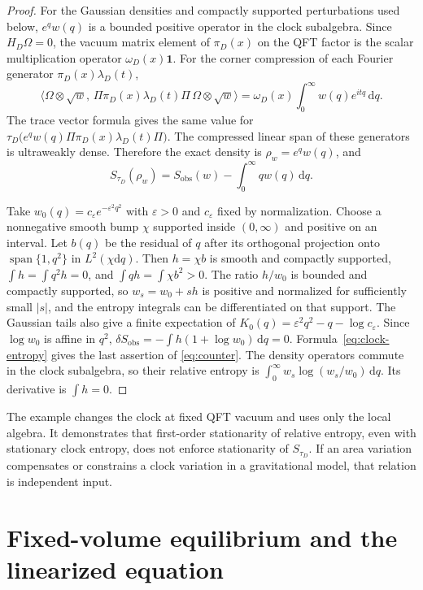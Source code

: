 \documentclass[11pt,a4paper]{article}
\numberwithin{equation}{section}
\theoremstyle{remark}
\newcommand{\dd}{\mathrm d}
\newcommand{\Sobs}{S_{\mathrm{obs}}}
\newcommand{\eps}{\varepsilon}
\newcommand{\one}{\mathbf 1}
\begin{document}
\begin{proof}
For the Gaussian densities and compactly supported perturbations used below, $e^qw(q)$ is a bounded positive operator in the clock subalgebra. Since $H_D\Omega=0$, the vacuum matrix element of $\pi_D(x)$ on the QFT factor is the scalar multiplication operator $\omega_D(x)\one$. For the corner compression of each Fourier generator $\pi_D(x)\lambda_D(t)$,
\[
 \big\langle\Omega\otimes\sqrt w,\,\Pi\pi_D(x)\lambda_D(t)\Pi
                     \,\Omega\otimes\sqrt w\big\rangle
 =\omega_D(x)\int_0^\infty w(q)e^{itq}\,\dd q .
\]
The trace vector formula gives the same value for
$\tau_D\bigl(e^qw(q)\Pi\pi_D(x)\lambda_D(t)\Pi\bigr)$.
The compressed linear span of these generators is ultraweakly dense. Therefore the exact density is $\rho_w=e^qw(q)$, and
\begin{equation}
 S_{\tau_D}(\rho_w)=\Sobs(w)-\int_0^\infty q w(q)\,\dd q.
 \label{eq:clock-entropy}
\end{equation}

Take $w_0(q)=c_\eps e^{-\eps^2 q^2}$ with $\eps>0$ and $c_\eps$ fixed by normalization. Choose a nonnegative smooth bump $\chi$ supported inside $(0,\infty)$ and positive on an interval. Let $b(q)$ be the residual of $q$ after its orthogonal projection onto $\operatorname{span}\{1,q^2\}$ in $L^2(\chi\dd q)$. Then $h=\chi b$ is smooth and compactly supported, $\int h=\int q^2 h=0$, and $\int qh=\int\chi b^2>0$. The ratio $h/w_0$ is bounded and compactly supported, so $w_s=w_0+sh$ is positive and normalized for sufficiently small $|s|$, and the entropy integrals can be differentiated on that support. The Gaussian tails also give a finite expectation of $K_0(q)=\eps^2 q^2-q-\log c_\eps$. Since $\log w_0$ is affine in $q^2$, $\delta\Sobs=-\int h(1+\log w_0)\,\dd q=0$. Formula~\eqref{eq:clock-entropy} gives the last assertion of \eqref{eq:counter}. The density operators commute in the clock subalgebra, so their relative entropy is $\int_0^\infty w_s\log(w_s/w_0)\,\dd q$. Its derivative is $\int h=0$.
\end{proof}

The example changes the clock at fixed QFT vacuum and uses only the local algebra. It demonstrates that first-order stationarity of relative entropy, even with stationary clock entropy, does not enforce stationarity of $S_{\tau_D}$. If an area variation compensates or constrains a clock variation in a gravitational model, that relation is independent input.

\section{Fixed-volume equilibrium and the linearized equation}
\label{sec:geometry}
\end{document}
